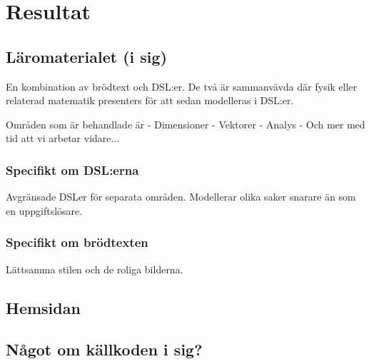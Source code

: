 
\chapter{Resultat}

\section{Läromaterialet (i sig)}

En kombination av brödtext och DSL:er. De två är sammanvävda där fysik eller relaterad matematik presenters för att sedan modelleras i DSL:er.

Områden som är behandlade är 
- Dimensioner
- Vektorer
- Analys
- Och mer med tid att vi arbetar vidare...

\subsection{Specifikt om DSL:erna}

Avgränsade DSLer för separata områden. Modellerar olika saker snarare än som en uppgiftslösare.

\subsection{Specifikt om brödtexten}

Lättsamma stilen och de roliga bilderna.

\section{Hemsidan}

\section{Något om källkoden i sig?}

